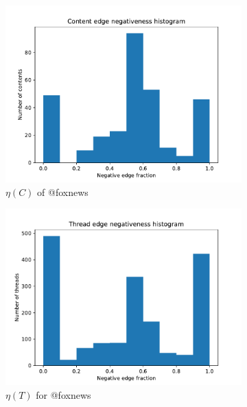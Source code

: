 \begin{figure}
\begin{center}
\begin{subfigure}[b]{0.4\textwidth}
			\centering
			\includegraphics[width=\textwidth]{tex/out/foxnews2000/neg-fraction-content-hist.pdf}
			\caption{$\eta(C)$ of @foxnews}
			\label{fig:foxnews-content-eta}
		\end{subfigure}
		\begin{subfigure}[b]{0.4\textwidth}
			\centering
			\includegraphics[width=\textwidth]{tex/out/foxnews2000/neg-fraction-thread-hist.pdf}
			\caption{$\eta(T)$ for @foxnews}
			\label{fig:foxnews-thread-eta}
		\end{subfigure}
		\begin{subfigure}[b]{0.4\textwidth}
			\centering

\end{subfigure}
\end{center}
\end{figure}
